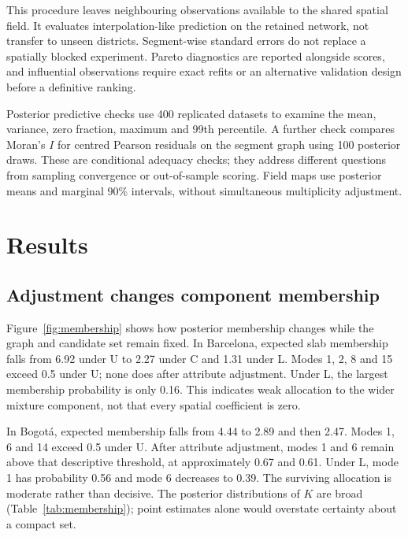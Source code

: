 \documentclass[11pt]{article}
\begin{document}
This procedure leaves neighbouring observations available to the shared spatial field. It evaluates interpolation-like prediction on the retained network, not transfer to unseen districts. Segment-wise standard errors do not replace a spatially blocked experiment. Pareto diagnostics are reported alongside scores, and influential observations require exact refits or an alternative validation design before a definitive ranking.

Posterior predictive checks use 400 replicated datasets to examine the mean, variance, zero fraction, maximum and 99th percentile. A further check compares Moran's $I$ for centred Pearson residuals on the segment graph using 100 posterior draws. These are conditional adequacy checks; they address different questions from sampling convergence or out-of-sample scoring. Field maps use posterior means and marginal 90\% intervals, without simultaneous multiplicity adjustment.

\section{Results}
\subsection{Adjustment changes component membership}
Figure~\ref{fig:membership} shows how posterior membership changes while the graph and candidate set remain fixed. In Barcelona, expected slab membership falls from 6.92 under U to 2.27 under C and 1.31 under L. Modes 1, 2, 8 and 15 exceed 0.5 under U; none does after attribute adjustment. Under L, the largest membership probability is only 0.16. This indicates weak allocation to the wider mixture component, not that every spatial coefficient is zero.

In Bogot\'a, expected membership falls from 4.44 to 2.89 and then 2.47. Modes 1, 6 and 14 exceed 0.5 under U. After attribute adjustment, modes 1 and 6 remain above that descriptive threshold, at approximately 0.67 and 0.61. Under L, mode 1 has probability 0.56 and mode 6 decreases to 0.39. The surviving allocation is moderate rather than decisive. The posterior distributions of $K$ are broad (Table~\ref{tab:membership}); point estimates alone would overstate certainty about a compact set.
\end{document}
